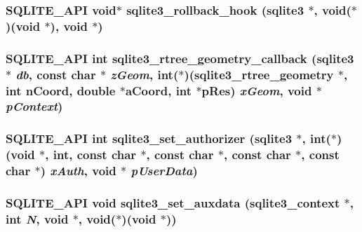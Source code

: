 \subsubsection{\setlength{\rightskip}{0pt plus 5cm}SQLITE\_\-API void$\ast$ sqlite3\_\-rollback\_\-hook (\bf{sqlite3} $\ast$, void($\ast$)(void $\ast$), void $\ast$)}\label{3_87_83_2sqlite3_8h_4d9fc8bdd3ca62d2e1dcf895ed839dee}


\subsubsection{\setlength{\rightskip}{0pt plus 5cm}SQLITE\_\-API int sqlite3\_\-rtree\_\-geometry\_\-callback (\bf{sqlite3} $\ast$ {\em db}, const char $\ast$ {\em z\-Geom}, int($\ast$)(\bf{sqlite3\_\-rtree\_\-geometry} $\ast$, int n\-Coord, double $\ast$a\-Coord, int $\ast$p\-Res) {\em x\-Geom}, void $\ast$ {\em p\-Context})}\label{3_87_83_2sqlite3_8h_cb94b790afa01aadcad8aed94e4e578d}


\subsubsection{\setlength{\rightskip}{0pt plus 5cm}SQLITE\_\-API int sqlite3\_\-set\_\-authorizer (\bf{sqlite3} $\ast$, int($\ast$)(void $\ast$, int, const char $\ast$, const char $\ast$, const char $\ast$, const char $\ast$) {\em x\-Auth}, void $\ast$ {\em p\-User\-Data})}\label{3_87_83_2sqlite3_8h_fb89d8aca6e9f51f21da892f1028700b}


\subsubsection{\setlength{\rightskip}{0pt plus 5cm}SQLITE\_\-API void sqlite3\_\-set\_\-auxdata (\bf{sqlite3\_\-context} $\ast$, int {\em N}, void $\ast$, void($\ast$)(void $\ast$))}\label{3_87_83_2sqlite3_8h_2daee656f04eb465ccd03c3938340f91}


